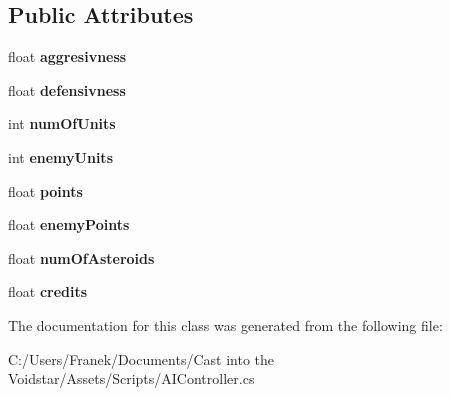 \subsection*{Public Attributes}
\begin{DoxyCompactItemize}
\item 
\hypertarget{class_a_i_controller_1_1_a_i_state_ac322a22e73dd6159e83649fdb754e738}{}float {\bfseries aggresivness}\label{class_a_i_controller_1_1_a_i_state_ac322a22e73dd6159e83649fdb754e738}

\item 
\hypertarget{class_a_i_controller_1_1_a_i_state_a37bf9e7234c9d32f606b073cc20cf96a}{}float {\bfseries defensivness}\label{class_a_i_controller_1_1_a_i_state_a37bf9e7234c9d32f606b073cc20cf96a}

\item 
\hypertarget{class_a_i_controller_1_1_a_i_state_a8711f514c2794b832cced06277497d42}{}int {\bfseries num\+Of\+Units}\label{class_a_i_controller_1_1_a_i_state_a8711f514c2794b832cced06277497d42}

\item 
\hypertarget{class_a_i_controller_1_1_a_i_state_a7eec1e67aa6c7ddc07bf395bc87e0f88}{}int {\bfseries enemy\+Units}\label{class_a_i_controller_1_1_a_i_state_a7eec1e67aa6c7ddc07bf395bc87e0f88}

\item 
\hypertarget{class_a_i_controller_1_1_a_i_state_a6c47557910a46907b216f583aea42495}{}float {\bfseries points}\label{class_a_i_controller_1_1_a_i_state_a6c47557910a46907b216f583aea42495}

\item 
\hypertarget{class_a_i_controller_1_1_a_i_state_a800d73bdf57da35525bf0c48ba16566b}{}float {\bfseries enemy\+Points}\label{class_a_i_controller_1_1_a_i_state_a800d73bdf57da35525bf0c48ba16566b}

\item 
\hypertarget{class_a_i_controller_1_1_a_i_state_a156330391c48aead4c966159e13171b7}{}float {\bfseries num\+Of\+Asteroids}\label{class_a_i_controller_1_1_a_i_state_a156330391c48aead4c966159e13171b7}

\item 
\hypertarget{class_a_i_controller_1_1_a_i_state_a27c6681fb9475fe31d5b4f505b30e961}{}float {\bfseries credits}\label{class_a_i_controller_1_1_a_i_state_a27c6681fb9475fe31d5b4f505b30e961}

\end{DoxyCompactItemize}


The documentation for this class was generated from the following file\+:\begin{DoxyCompactItemize}
\item 
C\+:/\+Users/\+Franek/\+Documents/\+Cast into the Voidstar/\+Assets/\+Scripts/A\+I\+Controller.\+cs\end{DoxyCompactItemize}
